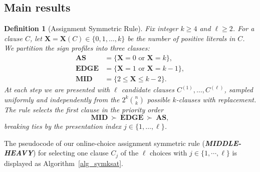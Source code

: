 \documentclass[11pt,reqno]{amsart}
\numberwithin{equation}{section}
\renewcommand{\vec}[1]{\boldsymbol{#1}}
\newcommand\vX{\vec X}
\newtheorem{definition}{Definition}[section]
\begin{document}
	\subsection{Main results}\label{sec_result}
	\begin{definition}[Assignment Symmetric Rule]\label{def:intro-symmetric}
		Fix integer $k\ge 4$ and $\ell\ge 2$.
		For a clause $C$, let $\vX=\vX(C)\in\{0,1,\ldots,k\}$ be the number of positive literals in $C$.
		We partition the sign profiles into three classes:
		\begin{align*}
			\textbf{AS}&=\{\vX=0 \text{ or } \vX=k\},\\
			\textbf{EDGE}&=\{\vX=1 \text{ or } \vX=k-1\},\\
			\textbf{MID}&=\{2\le \vX\le k-2\}.
		\end{align*}
		At each step we are presented with $\ell$ candidate clauses $C^{(1)},\ldots,C^{(\ell)}$, sampled uniformly and independently from the $2^k\binom{n}{k}$ possible $k$-clauses with replacement.
		The rule selects the first clause in the priority order
		\[
		\textbf{MID}~\succ~\textbf{EDGE}~\succ~\textbf{AS},
		\]
		breaking ties by the presentation index $j\in\{1,\ldots,\ell\}$.
	\end{definition}
	The pseudocode of our online-choice assignment symmetric rule (\emph{\textbf{MIDDLE-HEAVY}}) for selecting one clause $C_j$ of the $\ell$ choices with $j \in \{1,\cdots,\ell\}$ is displayed as Algorithm~\ref{alg_symksat}.
	
\end{document}
